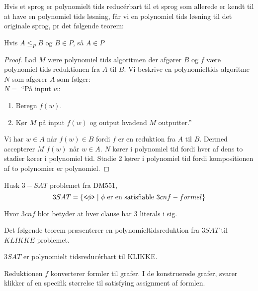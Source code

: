 Hvis et sprog er polynomielt tids reducérbart til et sprog som allerede er kendt til at have en polynomiel tids løsning, får vi en polynomiel tids løsning til det originale sprog, pr det følgende teorem:

\begin{theorem}
Hvis $A \le_{P} B$ og $B \in P$, så $A \in P$
\end{theorem}

\begin{proof}
  Lad $M$ være polynomiel tids algoritmen der afgører $B$ og $f$ være polynomiel tids reduktionen fra $A$ til $B$. Vi beskrive en polynomieltids algoritme $N$ som afgører $A$ som følger:\\
  \noindent
  $N = $ ``På input $w$:
  \begin{enumerate}
    \item Beregn $f(w)$.
    \item Kør $M$ på input $f(w)$ og output hvadend $M$ outputter.''
  \end{enumerate}

Vi har $w \in A$ når $f(w) \in B$ fordi $f$ er en reduktion fra $A$ til $B$. Dermed accepterer $M$ $f(w)$ når $w \in A$. $N$ kører i polynomiel tid fordi hver af dens to stadier kører i polynomiel tid. Stadie 2 kører i polynomiel tid fordi kompositionen af to polynomier er polynomiel.
\end{proof}

Husk $3-SAT$ problemet fra DM551,
\begin{equation*}
  3SAT = \{\text{\texttt{<$\phi$>}} \mid \phi \text{ er en satisfiable }3cnf-formel\}
\end{equation*}

Hvor $3cnf$ blot betyder at hver clause har 3 literals i sig.

Det følgende teorem præsenterer en polynomieltidsreduktion fra $3SAT$ til $KLIKKE$ problemet.

\begin{theorem}
$3SAT$ er polynomielt tidsreducérbart til KLIKKE.
\end{theorem}

Reduktionen $f$ konverterer formler til grafer. I de konstruerede grafer, svarer klikker af en specifik størrelse til satisfying assignment af formlen.

